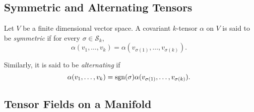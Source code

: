 \subsection{Symmetric and Alternating Tensors}

\begin{definition}
    Let $V$ be a finite dimensional vector space. A covariant $k$-tensor $\alpha$ on $V$ is said to be \emph{symmetric} if for every $\sigma\in\mathscr S_k$,
    \begin{equation*}
        \alpha(v_1,\dots,v_k) = \alpha(v_{\sigma(1)},\dots,v_{\sigma(k)}).
    \end{equation*}

    Similarly, it is said to be \emph{alternating} if 
    \begin{equation*}
        \alpha(v_1,\dots,v_k) = \operatorname{sgn}(\sigma)\alpha(v_{\sigma(1)},\dots,v_{\sigma(k)}).
    \end{equation*}
\end{definition}

\subsection{Tensor Fields on a Manifold}

